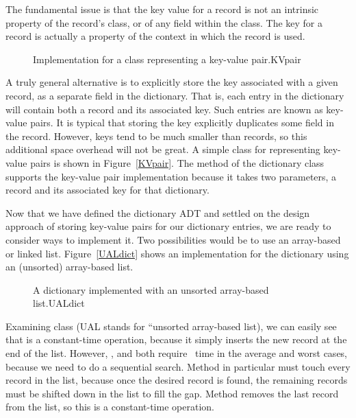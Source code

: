 The fundamental issue is that the key value for a record is not an
intrinsic property of the record's class, or of any field within the
class.
The key for a record is actually a property of the context in which
the record is used.

\begin{figure}

\vspace{-\bigskipamount}
{Implementation for a class representing a key-value pair.}{KVpair}
\end{figure}

A truly general alternative is to explicitly store the key associated
with a given record, as a separate field in the dictionary.
That is, each entry in the dictionary will contain both a record and
its associated key.
Such entries are known as key-value pairs.
It is typical that storing the key explicitly duplicates some field in
the record.
However, keys tend to be much smaller than records, so this additional
space overhead will not be great.
A simple class for representing key-value pairs is shown in
Figure~\ref{KVpair}.
The  method of the dictionary class supports the
key-value pair implementation because it takes two parameters, a record
and its associated key for that dictionary.

Now that we have defined the dictionary ADT and settled on the design
approach of storing key-value pairs for our dictionary entries, we are
ready to consider ways to implement it.
Two possibilities would be to use an array-based or linked list.
Figure~\ref{UALdict} shows an implementation for the dictionary using
an (unsorted) array-based list.

\begin{figure}
\vspace{-\bigskipamount}

{A dictionary implemented with an unsorted array-based list.}{UALdict}
\end{figure}

\begin{figure}
\captcont
\vspace{-\medskipamount}
\end{figure}

Examining class  (UAL stands for ``unsorted array-based
list), we can easily see that 
is a constant-time operation, because it simply inserts the new record
at the end of the list.
However, , and  both require \Thetan\ time in
the average and worst cases, because we need to do a sequential search.
Method  in particular must touch every record in the
list, because once the desired record is found, the remaining records
must be shifted down in the list to fill the gap.
Method  removes the last record from the list, so
this is a constant-time operation.

